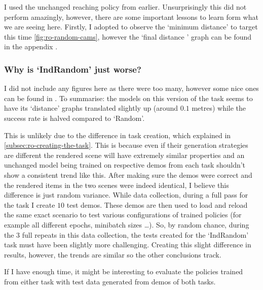 I used the unchanged reaching policy from earlier. Unsurprisingly this did not perform amazingly, however, there are some important lessons to learn form what we are seeing here. Firstly, I adopted to observe the `minimum distance' to target this time \ref{fig:ro-random-cams}, however the `final distance ' graph can be found in the appendix . 

\subsubsection{Why is `IndRandom' just worse?}
I did not include any figures here as there were too many, however some nice ones can be found in . To summarise: the models on this version of the task seems to have its `distance' graphs translated slightly up (around $0.1$ metres) while the success rate is halved compared to `Random'. 

This is unlikely due to the difference in task creation, which explained in \ref{subsec:ro-creating-the-task}. This is because even if their generation strategies are different the rendered scene will have extremely similar properties and an unchanged model being trained on respective demos from each task shouldn't show a consistent trend like this. 
After making sure the demos were correct and the rendered items in the two scenes were indeed identical, I believe this difference is just random variance. While data collection, during a full pass for the task I create $10$ test demos. These demos are then used to load and reload the same exact scenario to test various configurations of trained policies (for example all different epochs, minibatch sizes \ldots). So, by random chance, during the 3 full repeats in this data collection, the tests created for the `IndRandom' task must have been 
slightly more challenging. Creating this slight difference in results, however, the trends are similar so the other conclusions track.

If I have enough time, it might be interesting to evaluate the policies trained from either task with test data generated from demos of both tasks.

